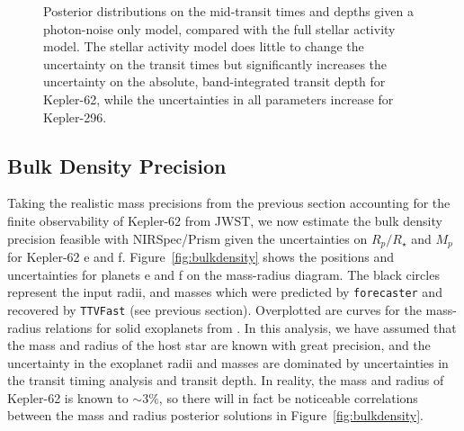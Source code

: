 \begin{figure}
\caption{Posterior distributions on the mid-transit times and depths given a photon-noise only model, compared with the full stellar activity model. The stellar activity model does little to change the uncertainty on the transit times
but significantly increases the uncertainty on the absolute, band-integrated transit depth for Kepler-62, while the uncertainties in all parameters increase for Kepler-296.}
\label{fig:photon_noise}
\end{figure}

\subsection{Bulk Density Precision}

Taking the realistic mass precisions from the previous section accounting for the finite observability of Kepler-62 from JWST, we now estimate the bulk density precision feasible with NIRSpec/Prism given the uncertainties on $R_p/R_\star$ and $M_p$ for Kepler-62 e and f. Figure~\ref{fig:bulkdensity} shows the positions and uncertainties for planets e and f on the mass-radius diagram. The black circles represent the input radii, and masses which were predicted by \texttt{forecaster} and recovered by \texttt{TTVFast} (see previous section). Overplotted are curves for the mass-radius relations for solid exoplanets from \citet{Seager2007}. In this analysis, we have assumed that the mass and radius of the host star are known with great precision, and the uncertainty in the exoplanet radii and masses are dominated by uncertainties in the transit timing analysis and transit depth. In reality, the mass and radius of Kepler-62 is known to $\sim3\%$, so there will in fact be noticeable correlations between the mass and radius posterior solutions in Figure~\ref{fig:bulkdensity}. 




